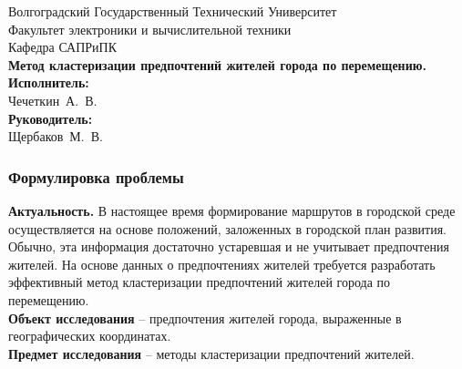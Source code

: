 \begin{frame}
    \begin{center}
        \small
        Волгоградский Государственный Технический Университет \\
        Факультет электроники и вычислительной техники \\
        Кафедра САПРиПК \\
        \vspace{1.5cm}
        \normalsize
        \textbf{Метод кластеризации предпочтений жителей города по
        перемещению.}\\
        \vspace{1.0cm}
        \raggedleft\small
        \textbf{Исполнитель:}\\Чечеткин~А.~В.\\
        \textbf{Руководитель:}\\Щербаков~М.~В.\\
        \vspace{1.5cm}
        \vspace{\fill}
         \the\year
    \end{center}
\end{frame}

\begin{frame}
    \frametitle{Формулировка проблемы}
    \textbf{Актуальность.} В настоящее время формирование маршрутов в городской
    среде осуществляется на основе положений, заложенных в городской план
    развития. Обычно, эта информация достаточно устаревшая и не учитывает
    предпочтения жителей. На основе данных о предпочтениях жителей требуется
    разработать эффективный метод кластеризации предпочтений жителей города
    по перемещению.\\
    \textbf{Объект исследования} -- предпочтения жителей города, выраженные
      в географических координатах.\\
    \textbf{Предмет исследования} -- методы кластеризации предпочтений жителей.
\end{frame}

